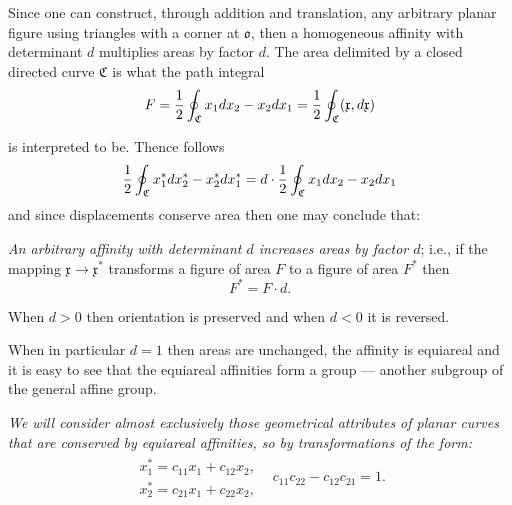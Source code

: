 \documentclass[11pt]{book} \usepackage{amssymb}
\newcommand{\myvec}[1]{\mathfrak{#1}}
\newcommand{\vecx}{\myvec{x}}
\begin{document}
Since one can construct, through addition and translation, any arbitrary planar 
figure using triangles with a corner at $\myvec{o}$, then a homogeneous 
affinity with determinant $d$ multiplies areas by factor $d$.
The area delimited by a closed directed curve $\mathfrak{C}$ is what the path
integral
\begin{equation}
  \label{eq:curve_area}
  F={1\over 2}\oint_\mathfrak{C}x_1dx_2-x_2dx_1
  ={1\over 2}\oint_\mathfrak{C}(\vecx,d\vecx)
\end{equation}
\begin{figure}[htp]
  \begin{center}
  \end{center}
  \caption{}
\end{figure}
is interpreted to be. Thence follows
\begin{equation}
  \label{eq:area_transformation}
  {1\over 2}\oint_\mathfrak{C}x^*_1dx^*_2-x^*_2dx^*_1
  =d\cdot{1\over 2}\oint_\mathfrak{C}x_1dx_2-x_2dx_1
\end{equation}
and since displacements conserve area then one may conclude that:

{\em An arbitrary affinity with determinant $d$ increases areas by factor $d$};
i.e., if the mapping $\vecx\to\vecx^*$ transforms a figure of area $F$
to a figure of area $F^*$ then
\begin{equation}
  \label{eq:area_transform2}
  F^*=F\cdot d.
\end{equation}

When $d>0$ then orientation is preserved and when $d<0$ it is reversed.

When in particular $d=1$ then areas are unchanged, the affinity is equiareal
and it is easy to see that the equiareal affinities form a group --- another
subgroup of the general affine group.

{\em We will consider almost exclusively those geometrical attributes of
planar curves that are conserved by equiareal affinities, so by transformations
of the form:}
\begin{equation}
  \label{eq:equiareal_affinities}
  \begin{array}{ll}
    \begin{array}{l}
      x_1^*=c_{11}x_1+c_{12}x_2,\\
      x_2^*=c_{21}x_1+c_{22}x_2,
    \end{array}
    & c_{11}c_{22}-c_{12}c_{21}=1.
  \end{array}
\end{equation}
\end{document}
